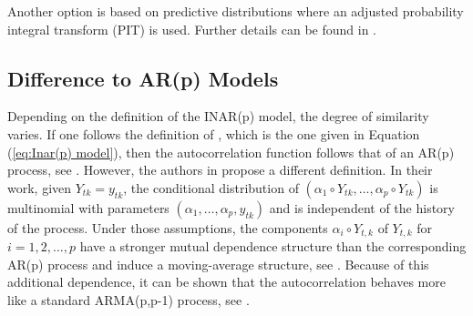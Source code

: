 Another option is based on predictive distributions where an adjusted probability integral transform (PIT) is used. Further details can be found in \textcite{Silva:2005}. 

\subsection{Difference to AR(p) Models}
\label{sec: Difference to AR models}


Depending on the definition of the INAR(p) model, the degree of similarity varies. If one follows the definition of \textcite{Guan:1991}, which is the one given in Equation (\ref{eq:Inar(p) model}), then the autocorrelation function follows that of an AR(p) process, see \textcite{Oliveira:2005}. However, the authors in \textcite{Alzaid:1990} propose a different definition. In their work, given $Y_{tk}=y_{tk}$, the conditional distribution of $(\alpha_1 \circ Y_{tk}, \ldots, \alpha_p \circ Y_{tk})$ is multinomial with parameters $( \alpha_1,\ldots,\alpha_p,y_{tk})$ and is independent of the history of the process. Under those assumptions, the components $\alpha_i \circ Y_{t,k}$ of $Y_{t,k}$ for $i=1,2,\ldots,p$  have a stronger mutual dependence structure than the corresponding AR(p) process and induce a moving-average structure, see \textcite{Alzaid:1990}. Because of this additional dependence, it can be shown that the autocorrelation behaves more like a standard ARMA(p,p-1) process, see \textcite{Alzaid:1990}. 